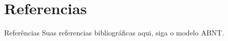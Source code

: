 \section{Referencias}
\begin{frame}{Referências}
	Suas referencias bibliográficas aqui, siga o modelo ABNT.
	
\end{frame}